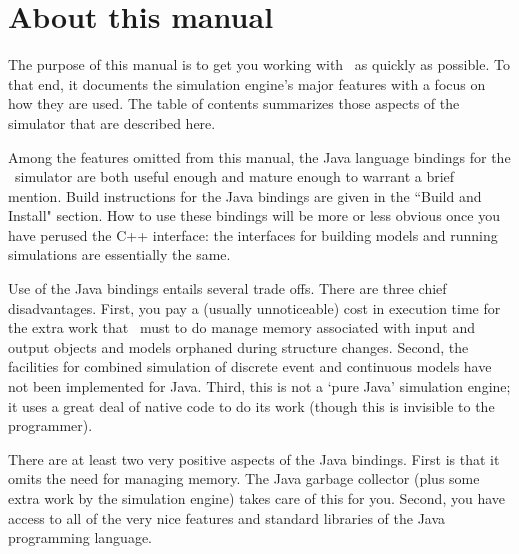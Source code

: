 \chapter{About this manual}
The purpose of this manual is to get you working with \adevs\ as quickly as possible. To that end, it documents the simulation engine's major features with a focus on how they are used. The table of contents summarizes those aspects of the simulator that are described here.

Among the features omitted from this manual, the Java language bindings for the \adevs\ simulator are both useful enough and mature enough to warrant a brief mention. Build instructions for the Java bindings are given in the ``Build and Install" section. How to use these bindings will be more or less obvious once you have perused the C++ interface: the interfaces for building models and running simulations are essentially the same.

Use of the Java bindings entails several trade offs. There are three chief disadvantages. First, you pay a (usually unnoticeable) cost in execution time for the extra work that \adevs\ must to do manage memory associated with input and output objects and models orphaned during structure changes. Second, the facilities for combined simulation of discrete event and continuous models have not been implemented for Java. Third, this is not a `pure Java' simulation engine; it uses a great deal of native code to do its work (though this is invisible to the programmer).

There are at least two very positive aspects of the Java bindings. First is that it omits the need for managing memory. The Java garbage collector (plus some extra work by the simulation engine) takes care of this for you. Second, you have access to all of the very nice features and standard libraries of the Java programming language.

